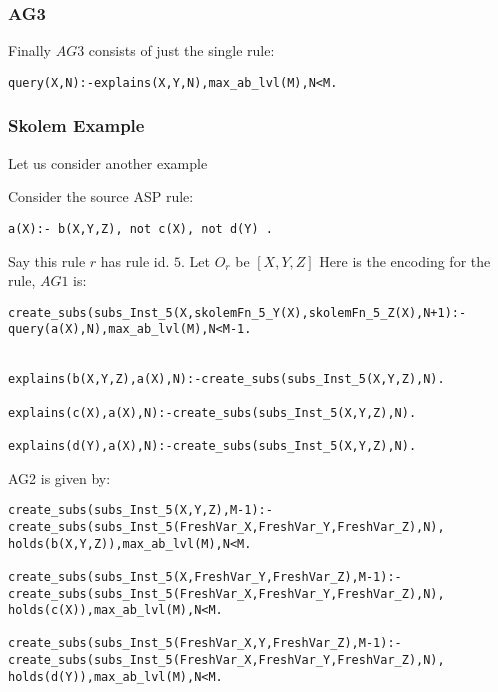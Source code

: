 \documentclass[sigconf]{acmart}
\begin{document}
\subsubsection{AG3}
Finally $AG3$ consists of just the single rule:
\begin{verbatim}
query(X,N):-explains(X,Y,N),max_ab_lvl(M),N<M.
\end{verbatim}
\subsubsection{Skolem Example}
Let us consider another example

Consider the source ASP rule:
\begin{verbatim}
a(X):- b(X,Y,Z), not c(X), not d(Y) .    
\end{verbatim}
Say this rule $r$ has rule id. $5$. 
Let $O_{r}$ be $[X,Y,Z]$ Here is the encoding for the rule, $AG1$ is:
\begin{verbatim}
create_subs(subs_Inst_5(X,skolemFn_5_Y(X),skolemFn_5_Z(X),N+1):-query(a(X),N),max_ab_lvl(M),N<M-1.


explains(b(X,Y,Z),a(X),N):-create_subs(subs_Inst_5(X,Y,Z),N).

explains(c(X),a(X),N):-create_subs(subs_Inst_5(X,Y,Z),N).

explains(d(Y),a(X),N):-create_subs(subs_Inst_5(X,Y,Z),N).

\end{verbatim}
AG2 is given by:
\begin{verbatim}
create_subs(subs_Inst_5(X,Y,Z),M-1):-create_subs(subs_Inst_5(FreshVar_X,FreshVar_Y,FreshVar_Z),N), 
holds(b(X,Y,Z)),max_ab_lvl(M),N<M.

create_subs(subs_Inst_5(X,FreshVar_Y,FreshVar_Z),M-1):-
create_subs(subs_Inst_5(FreshVar_X,FreshVar_Y,FreshVar_Z),N), holds(c(X)),max_ab_lvl(M),N<M.

create_subs(subs_Inst_5(FreshVar_X,Y,FreshVar_Z),M-1):-
create_subs(subs_Inst_5(FreshVar_X,FreshVar_Y,FreshVar_Z),N), holds(d(Y)),max_ab_lvl(M),N<M.
\end{verbatim}
\end{document}
